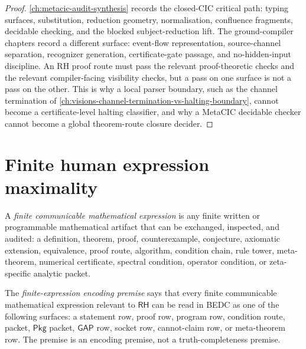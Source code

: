 \begin{proof}
\autoref{ch:metacic-audit-synthesis} records the closed-CIC critical path:
typing surfaces, substitution, reduction geometry, normalisation,
confluence fragments, decidable checking, and the blocked
subject-reduction lift.  The ground-compiler chapters record a different
surface: event-flow representation, source-channel separation, recognizer
generation, certificate-gate passage, and no-hidden-input discipline.  An
RH proof route must pass the relevant proof-theoretic checks and the
relevant compiler-facing visibility checks, but a pass on one surface is
not a pass on the other.  This is why a local parser boundary, such as the
channel termination of
\autoref{ch:visions-channel-termination-vs-halting-boundary}, cannot become
a certificate-level halting classifier, and why a MetaCIC decidable checker
cannot become a global theorem-route closure decider.
\end{proof}

\section{Finite human expression maximality}
\label{sec:rh-route-human-expression-maximality}

\begin{definition}
\label{def:rh-finite-communicable-expression}
A \emph{finite communicable mathematical expression} is any finite written
or programmable mathematical artifact that can be exchanged, inspected, and
audited: a definition, theorem, proof, counterexample, conjecture,
axiomatic extension, equivalence, proof route, algorithm, condition chain,
rule tower, meta-theorem, numerical certificate, spectral condition,
operator condition, or zeta-specific analytic packet.
\end{definition}

\begin{definition}
\label{def:rh-finite-expression-encoding-premise}
The \emph{finite-expression encoding premise} says that every finite
communicable mathematical expression relevant to $\mathsf{RH}$ can be read
in BEDC as one of the following surfaces: a statement row, proof row,
program row, condition route, \NameCert{} packet, $\mathsf{Pkg}$ packet,
$\mathsf{GAP}$ row, socket row, cannot-claim row, or meta-theorem row.  The
premise is an encoding premise, not a truth-completeness premise.
\end{definition}

